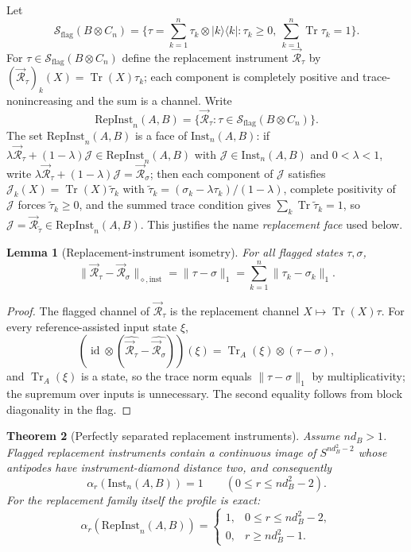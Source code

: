 \documentclass[11pt,a4paper]{article}
\newtheorem{theorem}{Theorem}[section]
\newtheorem{lemma}[theorem]{Lemma}
\newcommand{\Sstate}{\mathcal{S}}
\newcommand{\Inst}{\mathrm{Inst}}
\newcommand{\RepInst}{\mathrm{RepInst}}
\newcommand{\Tr}{\operatorname{Tr}}
\newcommand{\id}{\operatorname{id}}
\begin{document}
Let
\[
\Sstate_{\mathrm{flag}}(B\otimes C_n)
=\Big\{\tau=\sum_{k=1}^n\tau_k\otimes|k\rangle\langle k|:
\tau_k\ge0,\ \sum_{k=1}^n\Tr\tau_k=1\Big\}.
\]
For $\tau\in\Sstate_{\mathrm{flag}}(B\otimes C_n)$ define the replacement instrument $\vec{\mathcal R}_\tau$ by $(\vec{\mathcal R}_\tau)_k(X)=\Tr(X)\tau_k$; each component is completely positive and trace-nonincreasing and the sum is a channel. Write
\[
\RepInst_n(A,B)=\{\vec{\mathcal R}_\tau:\tau\in\Sstate_{\mathrm{flag}}(B\otimes C_n)\}.
\]
The set $\RepInst_n(A,B)$ is a face of $\Inst_n(A,B)$: if $\lambda\vec{\mathcal R}_\tau+(1-\lambda)\mathcal J\in\RepInst_n(A,B)$ with $\mathcal J\in\Inst_n(A,B)$ and $0<\lambda<1$, write $\lambda\vec{\mathcal R}_\tau+(1-\lambda)\mathcal J=\vec{\mathcal R}_\sigma$; then each component of $\mathcal J$ satisfies $\mathcal J_k(X)=\Tr(X)\tilde\tau_k$ with $\tilde\tau_k=(\sigma_k-\lambda\tau_k)/(1-\lambda)$, complete positivity of $\mathcal J$ forces $\tilde\tau_k\ge0$, and the summed trace condition gives $\sum_k\Tr\tilde\tau_k=1$, so $\mathcal J=\vec{\mathcal R}_{\tilde\tau}\in\RepInst_n(A,B)$. This justifies the name \emph{replacement face} used below.

\begin{lemma}[Replacement-instrument isometry]
\label{lem:replacement-isometry}
For all flagged states $\tau,\sigma$,
\[
\|\vec{\mathcal R}_\tau-\vec{\mathcal R}_\sigma\|_{\diamond,\mathrm{inst}}
=\|\tau-\sigma\|_1=\sum_{k=1}^n\|\tau_k-\sigma_k\|_1.
\]
\end{lemma}

\begin{proof}
The flagged channel of $\vec{\mathcal R}_\tau$ is the replacement channel $X\mapsto\Tr(X)\tau$. For every reference-assisted input state $\xi$,
\[
(\id\otimes(\widehat{\vec{\mathcal R}_\tau}-\widehat{\vec{\mathcal R}_\sigma}))(\xi)
=\Tr_A(\xi)\otimes(\tau-\sigma),
\]
and $\Tr_A(\xi)$ is a state, so the trace norm equals $\|\tau-\sigma\|_1$ by multiplicativity; the supremum over inputs is unnecessary. The second equality follows from block diagonality in the flag.
\end{proof}

\begin{theorem}[Perfectly separated replacement instruments]
\label{thm:replacement-profile}
Assume $nd_B>1$. Flagged replacement instruments contain a continuous image of $S^{nd_B^2-2}$ whose antipodes have instrument-diamond distance two, and consequently
\[
\alpha_r(\Inst_n(A,B))=1\qquad(0\le r\le nd_B^2-2).
\]
For the replacement family itself the profile is exact:
\[
\alpha_r(\RepInst_n(A,B))=
\begin{cases}
1,&0\le r\le nd_B^2-2,\\
0,&r\ge nd_B^2-1.
\end{cases}
\]
\end{theorem}
\end{document}
